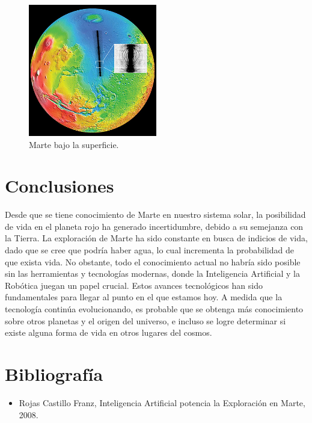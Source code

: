 \documentclass[a4paper]{article}
\begin{document}
\begin{figure}
\centering
\includegraphics[width=0.5\textwidth]{marte-express.jpg}
\caption{\label{fig:frog}  Marte bajo la superficie.}
\end{figure}

\section{Conclusiones}
Desde que se tiene conocimiento de Marte en nuestro sistema solar, la posibilidad de vida en el planeta rojo ha generado incertidumbre, debido a su semejanza con la Tierra. La exploración de Marte ha sido constante en busca de indicios de vida, dado que se cree que podría haber agua, lo cual incrementa la probabilidad de que exista vida. No obstante, todo el conocimiento actual no habría sido posible sin las herramientas y tecnologías modernas, donde la Inteligencia Artificial y la Robótica juegan un papel crucial. Estos avances tecnológicos han sido fundamentales para llegar al punto en el que estamos hoy. A medida que la tecnología continúa evolucionando, es probable que se obtenga más conocimiento sobre otros planetas y el origen del universo, e incluso se logre determinar si existe alguna forma de vida en otros lugares del cosmos.

\section{Bibliografía }



\begin{itemize}
\item Rojas Castillo Franz, Inteligencia Artificial potencia la Exploración en Marte, 2008.\end{itemize}





 
\end{document}

